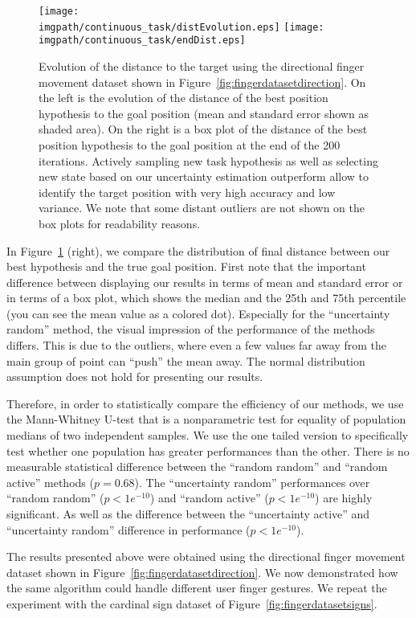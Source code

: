 \begin{figure}[!htbp]
\centering
\texttt{[image: \\imgpath/continuous\_task/distEvolution.eps]}
\texttt{[image: \\imgpath/continuous\_task/endDist.eps]}
\caption{Evolution of the distance to the target using the directional finger movement dataset shown in Figure~\ref{fig:fingerdatasetdirection}. On the left is the evolution of the distance of the best position hypothesis to the goal position (mean and standard error shown as shaded area). On the right is a box plot of the distance of the best position hypothesis to the goal position at the end of the 200 iterations. Actively sampling new task hypothesis as well as selecting new state based on our uncertainty estimation outperform allow to identify the target position with very high accuracy and low variance. We note that some distant outliers are not shown on the box plots for readability reasons.}
\label{fig:continuoustaskdistevolution}
\end{figure}

In Figure~\ref{fig:continuoustaskdistevolution} (right), we compare the distribution of final distance between our best hypothesis and the true goal position. First note that the important difference between displaying our results in terms of mean and standard error or in terms of a box plot, which shows the median and the 25th and 75th percentile (you can see the mean value as a colored dot). Especially for the ``uncertainty random'' method, the visual impression of the performance of the methods differs. This is due to the outliers, where even a few values far away from the main group of point can ``push'' the mean away. The normal distribution assumption does not hold for presenting our results. 

Therefore, in order to statistically compare the efficiency of our methods, we use the Mann-Whitney U-test \cite{mann1947test} that is a nonparametric test for equality of population medians of two independent samples. We use the one tailed version to specifically test whether one population has greater performances than the other. There is no measurable statistical difference between the ``random random'' and ``random active'' methods ($p = 0.68$). The ``uncertainty random'' performances over ``random random'' ($p<1e^{-10}$) and ``random active'' ($p<1e^{-10}$) are highly significant. As well as the difference between the ``uncertainty active'' and ``uncertainty random'' difference in performance ($p<1e^{-10}$).

The results presented above were obtained using the directional finger movement dataset shown in Figure~\ref{fig:fingerdatasetdirection}. We now demonstrated how the same algorithm could handle different user finger gestures. We repeat the experiment with the cardinal sign dataset of Figure~\ref{fig:fingerdatasetsigns}.

